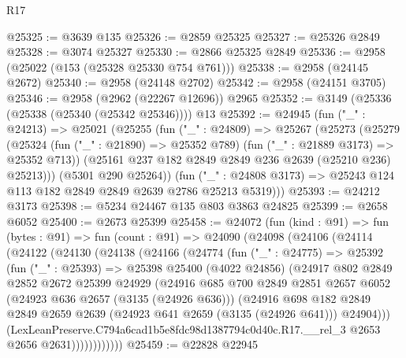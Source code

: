 \begin{lexlean}{R17}
\begin{coremodule}
@25325 := @3639 @135
@25326 := @2859 @25325
@25327 := @25326 @2849
@25328 := @3074 @25327
@25330 := @2866 @25325 @2849
@25336 := @2958 (@25022 (@153 (@25328 @25330 @754 @761)))
@25338 := @2958 (@24145 @2672)
@25340 := @2958 (@24148 @2702)
@25342 := @2958 (@24151 @3705)
@25346 := @2958 (@2962 (@22267 @12696)) @2965
@25352 := @3149 (@25336 (@25338 (@25340 (@25342 @25346)))) @13
@25392 := @24945
    (fun ("_" : @24213) =>
    @25021
      (@25255
        (fun ("_" : @24809) =>
        @25267
          (@25273
            (@25279
              (@25324 (fun ("_" : @21890) => @25352 @789) (fun ("_" : @21889 @3173) => @25352 @713))
              (@25161 @237 @182 @2849 @2849 @236 @2639 (@25210 @236) @25213)))
          (@5301 @290 @25264))
        (fun ("_" : @24808 @3173) => @25243 @124 @113 @182 @2849 @2849 @2639 @2786 @25213 @5319)))
@25393 := @24212 @3173
@25398 := @5234 @24467 @135 @803 @3863 @24825
@25399 := @2658 @6052
@25400 := @2673 @25399
@25458 := @24072
    (fun (kind : @91) =>
    fun (bytes : @91) =>
    fun (count : @91) =>
    @24090
      (@24098
        (@24106
          (@24114
            (@24122
              (@24130
                (@24138
                  (@24166
                    (@24774
                      (fun ("_" : @24775) =>
                      @25392
                        (fun ("_" : @25393) =>
                        @25398
                          @25400
                          (@4022 @24856)
                          (@24917
                            @802
                            @2849
                            @2852
                            @2672
                            @25399
                            @24929
                            (@24916
                              @685
                              @700
                              @2849
                              @2851
                              @2657
                              @6052
                              (@24923 @636 @2657 (@3135 (@24926 @636)))
                              (@24916
                                @698
                                @182
                                @2849
                                @2849
                                @2659
                                @2639
                                (@24923 @641 @2659 (@3135 (@24926 @641)))
                                @24904)))
                          (LexLeanPreserve.C794a6cad1b5e8fdc98d1387794c0d40c.R17.__rel_3
                            @2653
                            @2656
                            @2631))))))))))))
@25459 := @22828 @22945

\end{coremodule}
\end{lexlean}
